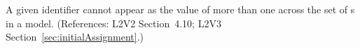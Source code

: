 A given identifier cannot appear as the value of more than one
  across the set of \InitialAssignment{}s in a model.
(References: L2V2 Section~4.10; L2V3 Section~\ref{sec:initialAssignment}.)
